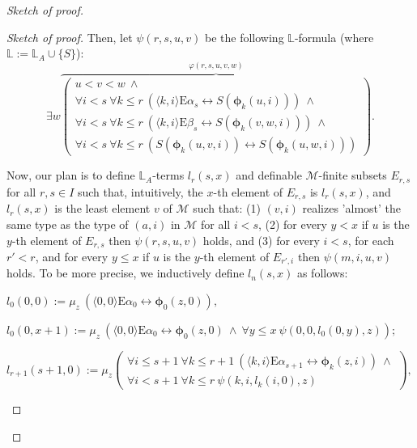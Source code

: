 \documentclass[11pt]{article}
\theoremstyle{plain}
\theoremstyle{definition}
\newcommand{\M}{\mathcal{M}}
\newcommand{\E}{\mathrm{E}}
\begin{document}
\begin{proof}[Sketch of proof]
\begin{proof}[Sketch of proof]
Then,  let $\psi(r,s,u,v)$ be the following $\mathbb{L}$-formula (where $\mathbb{L}:=\mathbb{L}_{A}\cup\{S\}$):
$$\exists w \overset{\varphi(r,s,u,v,w)}{\overbrace{\left(\begin{array}{c}
	u<v<w\ \wedge \\
\forall i<s \ \forall k\leq r \ (
\langle k,i\rangle\E\alpha_{s}\leftrightarrow S(\bm{\phi}_{k}(u,i))) \ \wedge \\
\forall i<s \ \forall k\leq r \ (
\langle k,i\rangle\E\beta_{s}\leftrightarrow S(\bm{\phi}_{k}(v,w,i))) \ \wedge \\
\forall i<s \ \forall k\leq r \ (S(\bm{\phi}_{k}(u,v,i))
\leftrightarrow S(\bm{\phi}_{k}(u,w,i)))
\end{array}\right)}}. $$

Now, our plan is to define  $\mathbb{L}_{A}$-terms $l_{r}(s,x)$ and   definable $\M$-finite subsets $E_{r,s}$  for all $r,s\in I$ such that, intuitively, the $x$-th element of $E_{r,s}$ is $l_{r}(s,x)$, and $l_{r}(s,x)$ is the least element $v$ of $\M$ such that: (1)  $(v,i)$ realizes 'almost' the same type as the type of $(a,i)$ in $\M$ for all $i<s$, (2) for every $y<x$ if $u$  is the $y$-th element of   $E_{r,s}$ then $\psi(r,s,u,v)$ holds, and (3) for every $i<s$, for each $r'< r$, and for every $y\leq x$ if $ u$ is the $y$-th element of  $E_{r',i}$ then  $\psi(m,i,u,v)$ holds. To be more precise, we inductively define  $l_{n}(s,x)$  as follows:
\begin{center}
$l_{0}(0,0):=\mu_{z} \ (\langle 0,0\rangle\E\alpha_{0}\leftrightarrow \bm{\phi}_{0}(z,0)) ,$ 

$l_{0}(0,x+1):=\mu_{z} \ (\langle 0,0\rangle\E\alpha_{0}\leftrightarrow \bm{\phi}_{0}(z,0) \ \wedge \ 
\forall y\leq x \ \psi(0,0,l_{0}(0,y),z))
;$ 

$l_{r+1}(s+1,0):=\mu_{z} \left(\begin{array}{c}
	\forall i\leq s+1 \ \forall k\leq r+1 \ (
	\langle k,i\rangle\E\alpha_{s+1}\leftrightarrow \bm{\phi}_{k}(z,i)) \ \wedge \\
	\forall i<s+1 \ \forall k\leq r \ \psi(k,i,l_{k}(i,0),z) 
\end{array}\right),$\\


\end{center}
\end{proof}
\end{proof}
\end{document}
